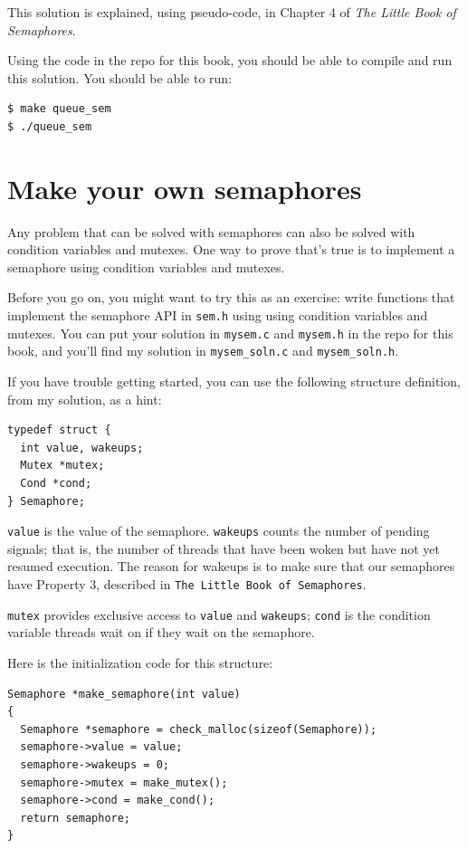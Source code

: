 \documentclass[12pt]{book}
\begin{document}
This solution is explained, using pseudo-code, in Chapter 4 of
{\it The Little Book of Semaphores}.

Using the code in the repo for this book, you should be able to compile
and run this solution.  You should be able to run:

\begin{verbatim}
$ make queue_sem
$ ./queue_sem
\end{verbatim}



\section{Make your own semaphores}
\label{makeyourown}

Any problem that can be solved with semaphores can also be solved
with condition variables and mutexes.  One way to prove that's true
is to implement a semaphore using condition variables and mutexes.

Before you go on, you might want to try this as an exercise: write
functions that implement the semaphore API in {\tt sem.h}
using using condition variables and mutexes.  You can put your
solution in {\tt mysem.c} and {\tt mysem.h} in the repo for this book,
and you'll find my solution in \verb"mysem_soln.c" and
\verb"mysem_soln.h".

If you have trouble getting started, you can use the following
structure definition, from my solution, as a hint:

\begin{verbatim}
typedef struct {
  int value, wakeups;
  Mutex *mutex;
  Cond *cond;
} Semaphore;
\end{verbatim}

{\tt value} is the value of the semaphore.  {\tt wakeups} counts
the number of pending signals; that is, the number of threads
that have been woken but have not yet resumed execution.  The reason
for wakeups is to make sure that our semaphores have
Property 3, described in {\tt The Little Book of Semaphores}.

{\tt mutex} provides exclusive access to {\tt value} and
{\tt wakeups}; {\tt cond} is the condition variable threads
wait on if they wait on the semaphore.

Here is the initialization code for this structure:

\begin{verbatim}
Semaphore *make_semaphore(int value)
{
  Semaphore *semaphore = check_malloc(sizeof(Semaphore));
  semaphore->value = value;
  semaphore->wakeups = 0;
  semaphore->mutex = make_mutex();
  semaphore->cond = make_cond();
  return semaphore;
}
\end{verbatim}
\end{document}
